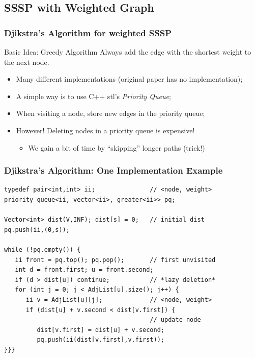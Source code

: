 \documentclass{beamer}
\begin{document}
\subsection{SSSP with Weighted Graph}
\begin{frame}
  \frametitle{Djikstra's Algorithm for weighted SSSP}
  \begin{block}{Basic Idea: Greedy Algorithm}
    Always add the edge with the shortest weight to the next node.
  \end{block}

  {\small
  \begin{itemize}
  \item Many different implementations (original paper has no implementation);

    \bigskip
    
  \item A simple way is to use C++ stl's \emph{Priority Queue};
  \item When visiting a node, store new edges in the priority queue;
  \item However! Deleting nodes in a priority queue is expensive!
    \begin{itemize}
    \item We gain a bit of time by ``skipping'' longer paths (trick!)
    \end{itemize}
  \end{itemize}}
\end{frame}

\begin{frame}[fragile]
  \frametitle{Djikstra's Algorithm: One Implementation Example}
  {\smaller
    \begin{exampleblock}{}
\begin{verbatim}
typedef pair<int,int> ii;               // <node, weight>
priority_queue<ii, vector<ii>, greater<ii>> pq; 

Vector<int> dist(V,INF); dist[s] = 0;   // initial dist
pq.push(ii,(0,s));

while (!pq.empty()) {
   ii front = pq.top(); pq.pop();       // first unvisited
   int d = front.first; u = front.second;
   if (d > dist[u]) continue;           // *lazy deletion*
   for (int j = 0; j < AdjList[u].size(); j++) { 
      ii v = AdjList[u][j];             // <node, weight>
      if (dist[u] + v.second < dist[v.first]) { 
                                        // update node
         dist[v.first] = dist[u] + v.second;
         pq.push(ii(dist[v.first],v.first));
}}} 
\end{verbatim}
    \end{exampleblock}}
\end{frame}
\end{document}
